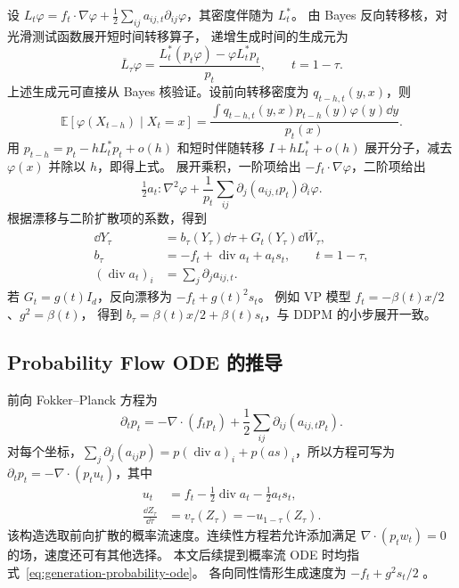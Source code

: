 设 \(L_t\varphi=f_t\cdot\nabla\varphi+
\frac12\sum_{ij}a_{ij,t}\partial_{ij}\varphi\)，其密度伴随为 \(L_t^*\)。
由 Bayes 反向转移核，对光滑测试函数展开短时间转移算子，
递增生成时间的生成元为
\[
 \overline L_\tau\varphi
   =\frac{L_t^*(p_t\varphi)-\varphi L_t^*p_t}{p_t},
 \qquad t=1-\tau.
\]
上述生成元可直接从 Bayes 核验证。设前向转移密度为 \(q_{t-h,t}(y,x)\)，则
\[
 \mathbb E[\varphi(X_{t-h})\mid X_t=x]
 =\frac{\int q_{t-h,t}(y,x)p_{t-h}(y)\varphi(y)\dd y}{p_t(x)}.
\]
用 \(p_{t-h}=p_t-hL_t^*p_t+o(h)\) 和短时伴随转移
\(I+hL_t^*+o(h)\) 展开分子，减去 \(\varphi(x)\) 并除以 \(h\)，即得上式。
展开乘积，一阶项给出 \(-f_t\cdot\nabla\varphi\)，二阶项给出
\[
 \tfrac12 a_t:\nabla^2\varphi+
 \frac1{p_t}\sum_{ij}\partial_j(a_{ij,t}p_t)\partial_i\varphi.
\]
根据漂移与二阶扩散项的系数，得到
\begin{equation}
 \begin{aligned}
 \dd Y_\tau&=b_\tau(Y_\tau)\dd\tau+G_t(Y_\tau)\dd\overline W_\tau,\\
 b_\tau&=-f_t+\operatorname{div}a_t+a_ts_t,\qquad t=1-\tau,\\
 (\operatorname{div}a_t)_i&=\sum_j\partial_j a_{ij,t}.
 \end{aligned}
 \label{eq:generation-reverse-sde}
\end{equation}
若 \(G_t=g(t)I_d\)，反向漂移为 \(-f_t+g(t)^2s_t\)。
例如 VP 模型 \(f_t=-\beta(t)x/2\)、\(g^2=\beta(t)\)，
得到 \(b_\tau=\beta(t)x/2+\beta(t)s_t\)，与 DDPM 的小步展开一致。

\subsection{Probability Flow ODE 的推导\requiredderivation}
\label{subsec:probability-flow}

前向 Fokker--Planck 方程为
\[
 \partial_t p_t=-\nabla\cdot(f_tp_t)+\frac12\sum_{ij}\partial_{ij}(a_{ij,t}p_t).
\]
对每个坐标，\(\sum_j\partial_j(a_{ij}p)
=p(\operatorname{div}a)_i+p(a s)_i\)，所以方程可写为
\(\partial_t p_t=-\nabla\cdot(p_tu_t)\)，其中
\begin{equation}
 \begin{aligned}
 u_t&=f_t-\tfrac12\operatorname{div}a_t-\tfrac12a_ts_t,\\
 \frac{\dd Z_\tau}{\dd\tau}&=v_\tau(Z_\tau)=-u_{1-\tau}(Z_\tau).
 \end{aligned}
 \label{eq:generation-probability-ode}
\end{equation}
该构造选取前向扩散的概率流速度。连续性方程若允许添加满足
\(\nabla\cdot(p_tw_t)=0\) 的场，速度还可有其他选择。
本文后续提到概率流 ODE 时均指式~\eqref{eq:generation-probability-ode}。
各向同性情形生成速度为 \(-f_t+g^2s_t/2\) \cite{song2021sde}。

